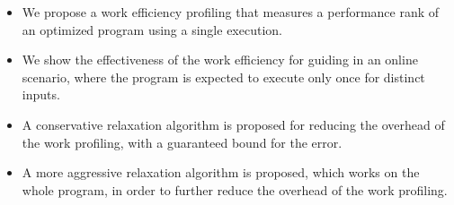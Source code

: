     \begin{itemize}[leftmargin=3mm]

        \item We propose a work efficiency profiling that measures a performance rank of an optimized program using a single execution.

        \item We show the effectiveness of the work efficiency for guiding {\itercomp} in an online scenario, where the program is expected
        to execute only once for distinct inputs.

        \item A conservative relaxation algorithm is proposed for reducing the overhead of the work profiling, with a guaranteed bound for
        the error.

        \item A more aggressive relaxation algorithm is proposed, which works on the whole program, in order to further reduce the overhead
        of the work profiling.

    \end{itemize}